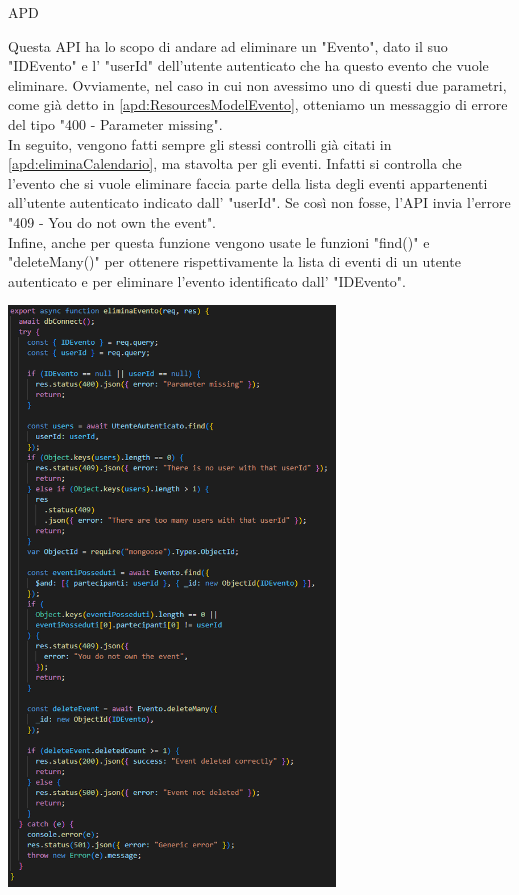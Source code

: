 \begin{listaPersonale} {APD}
\begin{listaPersonale2}[APD]{}
\begin{center}
                \end{center}
                Questa API ha lo scopo di andare ad eliminare un "Evento", dato il suo "IDEvento" e l' "userId" dell'utente autenticato che ha questo evento che vuole eliminare. Ovviamente, nel caso in cui non avessimo uno di questi due parametri, come già detto in \ref{apd:ResourcesModelEvento}, otteniamo un messaggio di errore del tipo "400 - Parameter missing". \\
                In seguito, vengono fatti sempre gli stessi controlli già citati in \ref{apd:eliminaCalendario}, ma stavolta per gli eventi. Infatti si controlla che l'evento che si vuole eliminare faccia parte della lista degli eventi appartenenti all'utente autenticato indicato dall' "userId". Se così non fosse, l'API invia l'errore "409 - You do not own the event". \\
                Infine, anche per questa funzione vengono usate le funzioni "find()" e "deleteMany()" per ottenere rispettivamente la lista di eventi di un utente autenticato e per eliminare l'evento identificato dall' "IDEvento".
                \begin{center}
                    \includegraphics[width=0.65\textwidth, height=0.7\textheight]{img/png/APIs/eliminaEvento.png}

\end{center}
\end{listaPersonale2}
\end{listaPersonale}
